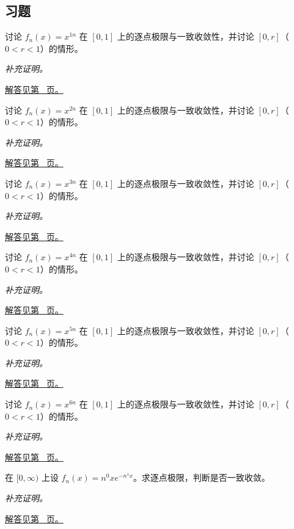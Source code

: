 \documentclass[12pt,fontset=fandol]{ctexart}
\begin{document}
\subsection{习题}
\begin{example}[边界层导致不一致收敛]\label{ex:c28q1}
讨论 $f_n(x)=x^{1n}$ 在 $[0,1]$ 上的逐点极限与一致收敛性，并讨论 $[0,r]$（$0<r<1$）的情形。
\par\textit{补充证明。}\par\hyperref[ans:c28q1]{解答见第~\pageref{ans:c28q1} 页。}
\end{example}
\begin{example}[边界层导致不一致收敛]\label{ex:c28q2}
讨论 $f_n(x)=x^{2n}$ 在 $[0,1]$ 上的逐点极限与一致收敛性，并讨论 $[0,r]$（$0<r<1$）的情形。
\par\textit{补充证明。}\par\hyperref[ans:c28q2]{解答见第~\pageref{ans:c28q2} 页。}
\end{example}
\begin{example}[边界层导致不一致收敛]\label{ex:c28q3}
讨论 $f_n(x)=x^{3n}$ 在 $[0,1]$ 上的逐点极限与一致收敛性，并讨论 $[0,r]$（$0<r<1$）的情形。
\par\textit{补充证明。}\par\hyperref[ans:c28q3]{解答见第~\pageref{ans:c28q3} 页。}
\end{example}
\begin{example}[边界层导致不一致收敛]\label{ex:c28q4}
讨论 $f_n(x)=x^{4n}$ 在 $[0,1]$ 上的逐点极限与一致收敛性，并讨论 $[0,r]$（$0<r<1$）的情形。
\par\textit{补充证明。}\par\hyperref[ans:c28q4]{解答见第~\pageref{ans:c28q4} 页。}
\end{example}
\begin{example}[边界层导致不一致收敛]\label{ex:c28q5}
讨论 $f_n(x)=x^{5n}$ 在 $[0,1]$ 上的逐点极限与一致收敛性，并讨论 $[0,r]$（$0<r<1$）的情形。
\par\textit{补充证明。}\par\hyperref[ans:c28q5]{解答见第~\pageref{ans:c28q5} 页。}
\end{example}
\begin{example}[边界层导致不一致收敛]\label{ex:c28q6}
讨论 $f_n(x)=x^{6n}$ 在 $[0,1]$ 上的逐点极限与一致收敛性，并讨论 $[0,r]$（$0<r<1$）的情形。
\par\textit{补充证明。}\par\hyperref[ans:c28q6]{解答见第~\pageref{ans:c28q6} 页。}
\end{example}
\begin{example}[移动峰值的函数列]\label{ex:c28q7}
在 $[0,\infty)$ 上设 $f_n(x)=n^{0}x e^{-n^{1}x}$。求逐点极限，判断是否一致收敛。
\par\textit{补充证明。}\par\hyperref[ans:c28q7]{解答见第~\pageref{ans:c28q7} 页。}
\end{example}
\end{document}
